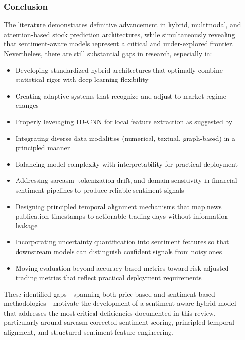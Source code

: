 \subsubsection{Conclusion}

The literature demonstrates definitive advancement in hybrid, multimodal, and attention-based stock prediction architectures, while simultaneously revealing that sentiment-aware models represent a critical and under-explored frontier. Nevertheless, there are still substantial gaps in research, especially in:
\begin{itemize}
    \item Developing standardized hybrid architectures that optimally combine statistical rigor with deep learning flexibility
    \item Creating adaptive systems that recognize and adjust to market regime changes
    \item Properly leveraging 1D-CNN for local feature extraction as suggested by \cite{eda2023}
    \item Integrating diverse data modalities (numerical, textual, graph-based) in a principled manner
    \item Balancing model complexity with interpretability for practical deployment
    \item Addressing sarcasm, tokenization drift, and domain sensitivity in financial sentiment pipelines to produce reliable sentiment signals
    \item Designing principled temporal alignment mechanisms that map news publication timestamps to actionable trading days without information leakage
    \item Incorporating uncertainty quantification into sentiment features so that downstream models can distinguish confident signals from noisy ones
    \item Moving evaluation beyond accuracy-based metrics toward risk-adjusted trading metrics that reflect practical deployment requirements
\end{itemize}

These identified gaps---spanning both price-based and sentiment-based methodologies---motivate the development of a sentiment-aware hybrid model that addresses the most critical deficiencies documented in this review, particularly around sarcasm-corrected sentiment scoring, principled temporal alignment, and structured sentiment feature engineering.


\newpage


